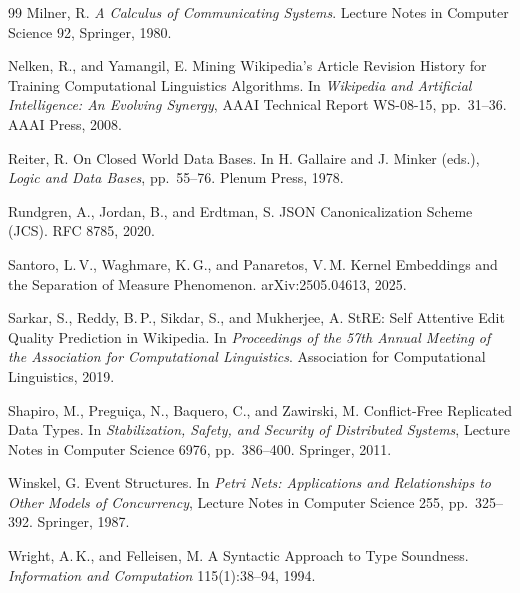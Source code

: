 \documentclass[12pt,oneside,openany]{book}
\theoremstyle{spherepop}
\theoremstyle{remarkstyle}
\begin{document}
\begin{thebibliography}{99}
 Milner, R. \emph{A Calculus of Communicating Systems}. Lecture Notes in Computer Science 92, Springer, 1980.

 Nelken, R., and Yamangil, E. Mining Wikipedia's Article Revision History for Training Computational Linguistics Algorithms. In \emph{Wikipedia and Artificial Intelligence: An Evolving Synergy}, AAAI Technical Report WS-08-15, pp.\ 31--36. AAAI Press, 2008.

 Reiter, R. On Closed World Data Bases. In H. Gallaire and J. Minker (eds.), \emph{Logic and Data Bases}, pp.\ 55--76. Plenum Press, 1978.

 Rundgren, A., Jordan, B., and Erdtman, S. JSON Canonicalization Scheme (JCS). RFC 8785, 2020.

 Santoro, L.\,V., Waghmare, K.\,G., and Panaretos, V.\,M. Kernel Embeddings and the Separation of Measure Phenomenon. arXiv:2505.04613, 2025.

 Sarkar, S., Reddy, B.\,P., Sikdar, S., and Mukherjee, A. StRE: Self Attentive Edit Quality Prediction in Wikipedia. In \emph{Proceedings of the 57th Annual Meeting of the Association for Computational Linguistics}. Association for Computational Linguistics, 2019.

 Shapiro, M., Pregui\c{c}a, N., Baquero, C., and Zawirski, M. Conflict-Free Replicated Data Types. In \emph{Stabilization, Safety, and Security of Distributed Systems}, Lecture Notes in Computer Science 6976, pp.\ 386--400. Springer, 2011.

 Winskel, G. Event Structures. In \emph{Petri Nets: Applications and Relationships to Other Models of Concurrency}, Lecture Notes in Computer Science 255, pp.\ 325--392. Springer, 1987.

 Wright, A.\,K., and Felleisen, M. A Syntactic Approach to Type Soundness. \emph{Information and Computation} 115(1):38--94, 1994.

\end{thebibliography}
\end{document}
